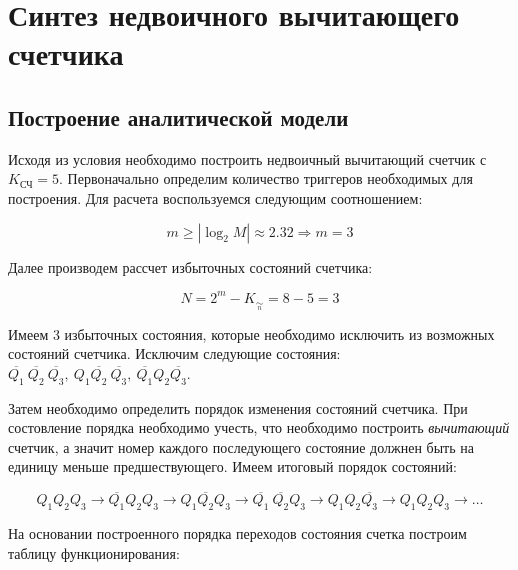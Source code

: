 \section*{Синтез недвоичного вычитающего счетчика}

\subsection*{Построение аналитической модели}

Исходя из условия необходимо построить недвоичный вычитающий счетчик с $K_{\text{СЧ}}=5$. 
Первоначально определим количество триггеров необходимых для построения. Для расчета
воспользуемся следующим соотношением:

$$
    m \geq \left| \log_{2}{M} \right| \approx 2.32 \Rightarrow m=3
$$

Далее производем рассчет избыточных состояний счетчика:

$$
    N=2^m - K_{\underset{n}{\sim}} = 8 - 5 = 3
$$

Имеем 3 избыточных состояния, которые необходимо исключить из возможных состояний счетчика. 
Исключим следующие состояния: $\overline{Q_1} \ \overline{Q_2} \ \overline{Q_3}, \
Q_1 \overline{Q_2} \ \overline{Q_3},\ \overline{Q_1} Q_2 \overline{Q_3}$. \par

Затем необходимо определить порядок изменения состояний счетчика. При состовление порядка необходимо
учесть, что необходимо построить \textit{вычитающий} счетчик, а значит номер каждого последующего состояние
должнен быть на единицу меньше предшествующего. Имеем итоговый порядок состояний:

$$
    Q_1 Q_2 Q_3 \rightarrow
    \overline{Q_1} Q_2 Q_3 \rightarrow
    Q_1 \overline{Q_2} Q_3 \rightarrow
    \overline{Q_1} \ \overline{Q_2} Q_3 \rightarrow
    Q_1 Q_2 \overline{Q_3} \rightarrow
    Q_1 Q_2 Q_3 \rightarrow \dots
$$

На основании построенного порядка переходов состояния счетка построим таблицу функционирования:

